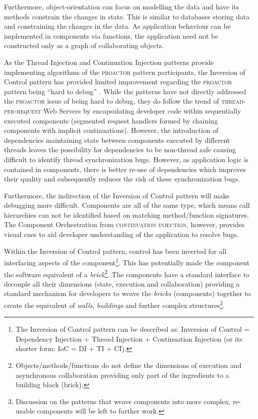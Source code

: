\documentclass[prodmode]{style/acmlarge}
\begin{document}
Furthermore, object-orientation can focus on modelling the data and have its
methods constrain the changes in state.  This is similar to databases storing
data and constraining the changes in the data.  As application behaviour can be
implemented in components via functions, the application need not be constructed
only as a graph of collaborating objects.

As the Thread Injection and Continuation Injection patterns provide implementing
algorithms of the \textsc{proactor} pattern participants, the Inversion of
Control pattern has provided limited improvement regarding the \textsc{proactor}
pattern being ``hard to debug'' \cite[p. 7]{proactor}.  While the patterns have
not directly addressed the \textsc{proactor} issue of being hard to debug, they
do follow the trend of \textsc{thread-per-request} Web Servers
\cite{thread-per-request} by encapsulating developer code within sequentially
executed components (segmented request handlers formed by chaining components
with implicit continuations).  However, the introduction of dependencies
maintaining state between components executed by different threads leaves the
possibility for dependencies to be non-thread safe causing difficult to identify
thread synchronization bugs.  However, as application logic is contained in
components, there is better re-use of dependencies which improves their quality
and subsequently reduces the risk of these synchronization bugs.

Furthermore, the indirection of the Inversion of Control pattern will make
debugging more difficult.  Components are all of the same type, which means call
hierarchies can not be identified based on matching method/function signatures. 
The Component Orchestration from \textsc{continuation injection}, however,
provides visual cues to aid developer understanding of the application to
resolve bugs.

Within the Inversion of Control pattern, control has been inverted for all
interfacing aspects of the component\footnote{The Inversion of Control pattern
can be described as: Inversion of Control = Dependency Injection + Thread
Injection + Continuation Injection (or its shorter form: IoC = DI + TI + CI).}.
This has potentially made the component the software equivalent of a
\textit{brick}\footnote{Objects/methods/functions do not define the dimensions
of execution and asynchronous collaboration providing only part of the
ingredients to a building block (brick).}.  The components have a standard
interface to decouple all their dimensions (state, execution and collaboration)
providing a standard mechanism for developers to weave the \textit{bricks}
(components) together to create the equivalent of \textit{walls},
\textit{buildings} and further complex structures\footnote{Discussion on the
patterns that weave components into more complex, re-usable components will be
left to further work.}.
\end{document}
